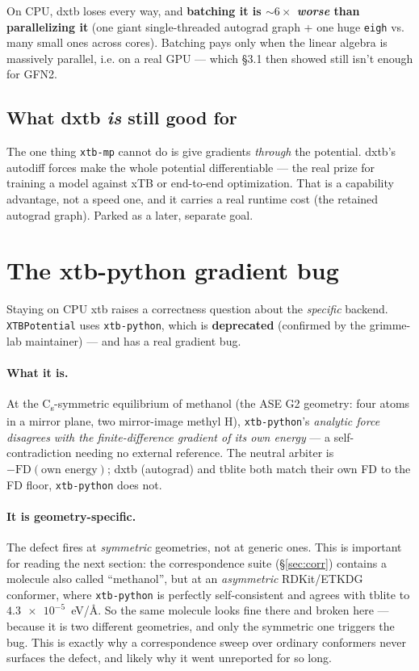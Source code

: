 \documentclass[11pt]{article}
\newcommand{\code}[1]{\texttt{#1}}
\newcommand{\xtbpy}{\code{xtb-python}}
\begin{document}
\noindent On CPU, dxtb loses every way, and \textbf{batching it is $\sim6\times$
\emph{worse} than parallelizing it} (one giant single-threaded autograd graph +
one huge \code{eigh} vs. many small ones across cores). Batching pays only when
the linear algebra is massively parallel, i.e. on a real GPU --- which \S3.1 then
showed still isn't enough for GFN2.

\subsection{What dxtb \emph{is} still good for}

The one thing \code{xtb-mp} cannot do is give gradients \emph{through} the
potential. dxtb's autodiff forces make the whole potential differentiable --- the
real prize for training a model against xTB or end-to-end optimization. That is a
capability advantage, not a speed one, and it carries a real runtime cost (the
retained autograd graph). Parked as a later, separate goal.

\medskip\noindent{}

\section{The xtb-python gradient bug}
\label{sec:bug}

Staying on CPU xtb raises a correctness question about the \emph{specific}
backend. \code{XTBPotential} uses \xtbpy{}, which is \textbf{deprecated} (confirmed
by the grimme-lab maintainer) --- and has a real gradient bug.

\paragraph{What it is.} At the C\textsubscript{s}-symmetric equilibrium of
methanol (the ASE G2 geometry: four atoms in a mirror plane, two mirror-image
methyl H), \xtbpy{}'s \emph{analytic force disagrees with the finite-difference
gradient of its own energy} --- a self-contradiction needing no external
reference. The neutral arbiter is $-\mathrm{FD}(\text{own energy})$; dxtb
(autograd) and tblite both match their own FD to the FD floor, \xtbpy{} does not.

\paragraph{It is geometry-specific.} The defect fires at \emph{symmetric}
geometries, not at generic ones. This is important for reading the next section:
the correspondence suite (\S\ref{sec:corr}) contains a molecule also called
``methanol'', but at an \emph{asymmetric} RDKit/ETKDG conformer, where \xtbpy{}
is perfectly self-consistent and agrees with tblite to $\num{4.3e-5}$~eV/\AA. So
the same molecule looks fine there and broken here --- because it is two different
geometries, and only the symmetric one triggers the bug. This is exactly why a
correspondence sweep over ordinary conformers never surfaces the defect, and
likely why it went unreported for so long.
\end{document}
